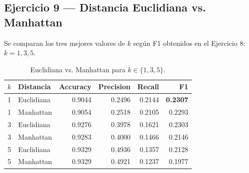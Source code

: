\subsection{Ejercicio 9 --- Distancia Euclidiana vs. Manhattan}

Se comparan los tres mejores valores de $k$ según F1 obtenidos en el
Ejercicio 8: $k=1,3,5$.

\begin{table}[H]
\centering
\begin{tabular}{rlrrrr}
\toprule
$k$ & Distancia & Accuracy & Precision & Recall & F1 \\
\midrule
1 & Euclidiana & 0.9044 & 0.2496 & 0.2144 & \textbf{0.2307} \\
1 & Manhattan  & 0.9054 & 0.2518 & 0.2105 & 0.2293 \\
3 & Euclidiana & 0.9276 & 0.3978 & 0.1621 & 0.2303 \\
3 & Manhattan  & 0.9283 & 0.4000 & 0.1466 & 0.2146 \\
5 & Euclidiana & 0.9329 & 0.4936 & 0.1357 & 0.2128 \\
5 & Manhattan  & 0.9329 & 0.4921 & 0.1237 & 0.1977 \\
\bottomrule
\end{tabular}
\caption{Euclidiana vs. Manhattan para $k \in \{1,3,5\}$.}
\end{table}

